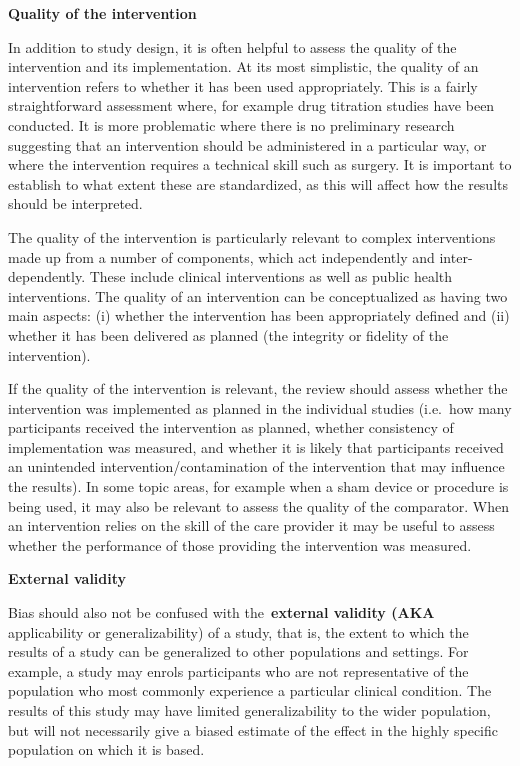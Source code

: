 \documentclass[
  10pt,
  a4paper,
  DIV=11,
  numbers=noendperiod]{scrreprt}
\begin{document}
\textbf{Quality of the intervention}

In addition to study design, it is often helpful to assess the quality
of the intervention and its implementation. At its most simplistic, the
quality of an intervention refers to whether it has been used
appropriately. This is a fairly straightforward assessment where, for
example drug titration studies have been conducted. It is more
problematic where there is no preliminary research suggesting that an
intervention should be administered in a particular way, or where the
intervention requires a technical skill such as surgery. It is important
to establish to what extent these are standardized, as this will affect
how the results should be interpreted.

The quality of the intervention is particularly relevant to complex
interventions made up from a number of components, which act
independently and inter-dependently. These include clinical
interventions as well as public health interventions. The quality of an
intervention can be conceptualized as having two main aspects: (i)
whether the intervention has been appropriately defined and (ii) whether
it has been delivered as planned (the integrity or fidelity of the
intervention).

If the quality of the intervention is relevant, the review should assess
whether the intervention was implemented as planned in the individual
studies (i.e.~how many participants received the intervention as
planned, whether consistency of implementation was measured, and whether
it is likely that participants received an unintended
intervention/contamination of the intervention that may influence the
results). In some topic areas, for example when a sham device or
procedure is being used, it may also be relevant to assess the quality
of the comparator. When an intervention relies on the skill of the care
provider it may be useful to assess whether the performance of those
providing the intervention was measured.

\textbf{External validity}

Bias should also not be confused with the~\textbf{external validity
(AKA} applicability or generalizability) of a study, that is, the extent
to which the results of a study can be generalized to other populations
and settings. For example, a study may enrols participants who are not
representative of the population who most commonly experience a
particular clinical condition. The results of this study may have
limited generalizability to the wider population, but will not
necessarily give a biased estimate of the effect in the highly specific
population on which it is based.~
\end{document}
